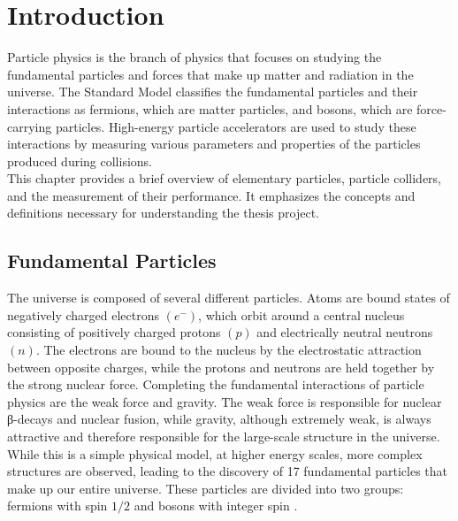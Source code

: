 \chapter{Introduction}
\label{ch1}

Particle physics is the branch of physics that focuses on studying the fundamental particles and forces that make up matter and radiation in the universe. The Standard Model classifies the fundamental particles and their interactions as fermions, which are matter particles, and bosons, which are force-carrying particles. High-energy particle accelerators are used to study these interactions by measuring various parameters and properties of the particles produced during collisions.\\This chapter provides a brief overview of elementary particles, particle colliders, and the measurement of their performance. It emphasizes the concepts and definitions necessary for understanding the thesis project.

\section{Fundamental Particles}

The universe is composed of several different particles. Atoms are bound states of negatively charged electrons $(e^{-})$, which orbit around a central nucleus consisting of positively charged protons $(p)$ and electrically neutral neutrons $(n)$. The electrons are bound to the nucleus by the electrostatic attraction between opposite charges, while the protons and neutrons are held together by the strong nuclear force. Completing the fundamental interactions of particle physics are the weak force and gravity. The weak force is responsible for nuclear β-decays and nuclear fusion, while gravity, although extremely weak, is always attractive and therefore responsible for the large-scale structure in the universe.
While this is a simple physical model, at higher energy scales, more complex structures are observed, leading to the discovery of 17 fundamental particles that make up our entire universe. These particles are divided into two groups: fermions with spin $1/2$ and bosons with integer spin \cite{thomson_2013}.\\


